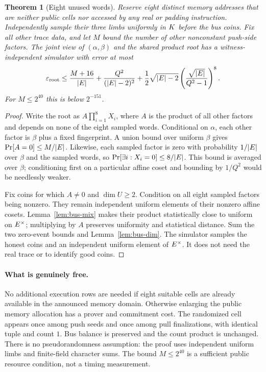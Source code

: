 \documentclass[11pt]{article}
\newtheorem{theorem}{Theorem}
\begin{document}
\begin{theorem}[Eight unused words]\label{thm:bus-root}
Reserve eight distinct memory addresses that are neither public cells nor accessed by any real or padding instruction. Independently sample their three limbs uniformly in $K$ before the bus coins. Fix all other trace data, and let $M$ bound the number of other nonconstant push-side factors. The joint view of $(\alpha,\beta)$ and the shared product root has a witness-independent simulator with error at most
\[
 \varepsilon_{\mathrm{root}}\le
 \frac{M+16}{|E|}+\frac{Q^2}{(|E|-2)^2}
 +\frac12\sqrt{|E|-2}
       \left(\frac{\sqrt{|E|}}{Q^2-1}\right)^8.
\]
For $M\le2^{40}$ this is below $2^{-151}$.
\end{theorem}
\begin{proof}
Write the root as $A\prod_{i=1}^8X_i$, where $A$ is the product of all other factors and depends on none of the eight sampled words. Conditional on $\alpha$, each other factor is $\beta$ plus a fixed fingerprint. A union bound over uniform $\beta$ gives $\Pr[A=0]\le M/|E|$. Likewise, each sampled factor is zero with probability $1/|E|$ over $\beta$ and the sampled words, so $\Pr[\exists i:X_i=0]\le8/|E|$. This bound is averaged over $\beta$; conditioning first on a particular affine coset and bounding by $1/Q^2$ would be needlessly weaker.

Fix coins for which $A\ne0$ and $\dim U\ge2$. Condition on all eight sampled factors being nonzero. They remain independent uniform elements of their nonzero affine cosets. Lemma~\ref{lem:bus-mix} makes their product statistically close to uniform on $E^\times$; multiplying by $A$ preserves uniformity and statistical distance. Sum the two zero-event bounds and Lemma~\ref{lem:bus-dim}. The simulator samples the honest coins and an independent uniform element of $E^\times$. It does not need the real trace or to identify good coins.
\end{proof}

\paragraph{What is genuinely free.} No additional execution rows are needed if eight suitable cells are already available in the announced memory domain. Otherwise enlarging the public memory allocation has a prover and commitment cost. The randomized cell appears once among push seeds and once among pull finalizations, with identical tuple and count $1$. Bus balance is preserved and the count product is unchanged. There is no pseudorandomness assumption: the proof uses independent uniform limbs and finite-field character sums. The bound $M\le2^{40}$ is a sufficient public resource condition, not a timing measurement.
\end{document}
